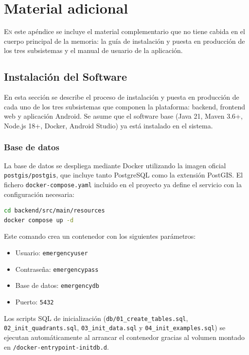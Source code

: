 \chapter{Material adicional}
\label{chap:adicional}

\lettrine{E}{n} este apéndice se incluye el material complementario que no tiene cabida en el cuerpo principal de la memoria: la guía de instalación y puesta en producción de los tres subsistemas y el manual de usuario de la aplicación.

\section{Instalación del Software}
\label{sec:instalacion}

En esta sección se describe el proceso de instalación y puesta en producción de cada uno de los tres subsistemas que componen la plataforma: backend, frontend web y aplicación Android. Se asume que el software base (Java 21, Maven 3.6+, Node.js 18+, Docker, Android Studio) ya está instalado en el sistema.

\subsection{Base de datos}

La base de datos se despliega mediante Docker utilizando la imagen oficial \texttt{postgis/postgis}, que incluye tanto PostgreSQL como la extensión PostGIS. El fichero \texttt{docker-compose.yaml} incluido en el proyecto ya define el servicio con la configuración necesaria:

\begin{lstlisting}[language=Bash]
cd backend/src/main/resources
docker compose up -d
\end{lstlisting}

Este comando crea un contenedor con los siguientes parámetros:
\begin{itemize}
  \item Usuario: \texttt{emergencyuser}
  \item Contraseña: \texttt{emergencypass}
  \item Base de datos: \texttt{emergencydb}
  \item Puerto: \texttt{5432}
\end{itemize}

Los scripts SQL de inicialización (\texttt{db/01\_create\_tables.sql}, \texttt{02\_init\_quadrants.sql}, \texttt{03\_init\_data.sql} y \texttt{04\_init\_examples.sql}) se ejecutan automáticamente al arrancar el contenedor gracias al volumen montado en \texttt{/docker-entrypoint-initdb.d}.

